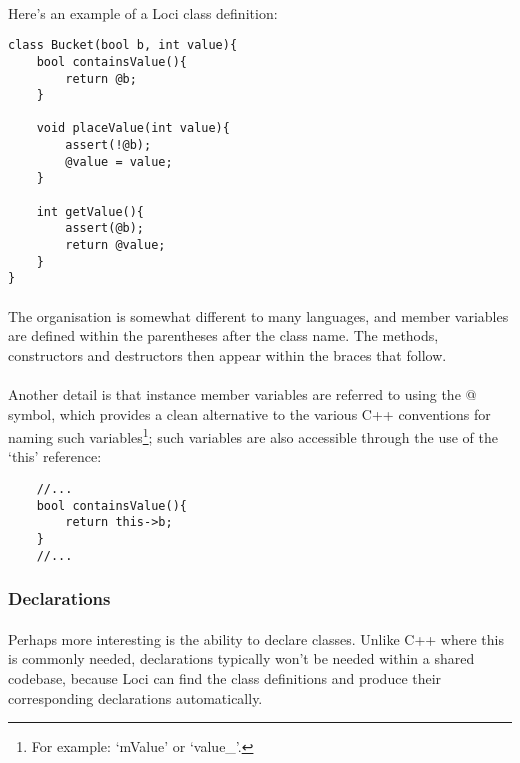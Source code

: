 \documentclass[12pt,twoside,notitlepage]{report}
\begin{document}
\paragraph{}
Here's an example of a Loci class definition:

\small{
\begin{verbatim}
class Bucket(bool b, int value){
    bool containsValue(){
        return @b;
    }
    
    void placeValue(int value){
        assert(!@b);
        @value = value;
    }
    
    int getValue(){
        assert(@b);
        return @value;
    }
}
\end{verbatim}
}

\paragraph{}
The organisation is somewhat different to many languages, and member variables are defined within the parentheses after the class name. The methods, constructors and destructors then appear within the braces that follow.

\paragraph{}
Another detail is that instance member variables are referred to using the @ symbol, which provides a clean alternative to the various C++ conventions for naming such variables\footnote{For example: `mValue' or `value\_'.}; such variables are also accessible through the use of the `this' reference:

\small{
\begin{verbatim}
    //...
    bool containsValue(){
        return this->b;
    }
    //...
\end{verbatim}
}

\subsubsection{Declarations}

\paragraph{}
Perhaps more interesting is the ability to declare classes. Unlike C++ where this is commonly needed, declarations typically won't be needed within a shared codebase, because Loci can find the class definitions and produce their corresponding declarations automatically.
\end{document}
